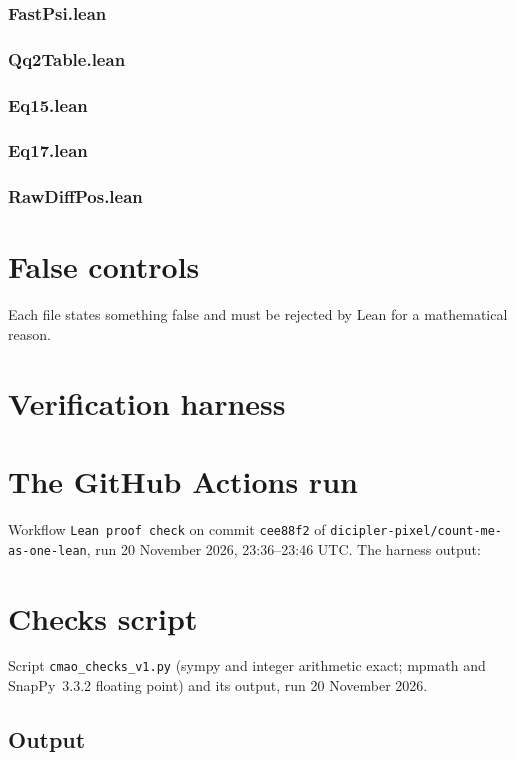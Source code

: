 \documentclass[11pt]{article}
\theoremstyle{definition}
\begin{document}
\subsubsection*{FastPsi.lean}
\subsubsection*{Qq2Table.lean}
\subsubsection*{Eq15.lean}
\subsubsection*{Eq17.lean}
\subsubsection*{RawDiffPos.lean}
\section{False controls}
Each file states something false and must be rejected by Lean for a mathematical reason.
\section{Verification harness}
\section{The GitHub Actions run}\label{app:ci}
Workflow \texttt{Lean proof check} on commit \texttt{cee88f2} of \texttt{dicipler-pixel/count-me-as-one-lean}, run 20 November 2026, 23:36--23:46 UTC. The harness output:
\section{Checks script}\label{app:checks}
Script \texttt{cmao\_checks\_v1.py} (sympy and integer arithmetic exact; mpmath and SnapPy~3.3.2 floating point) and its output, run 20 November 2026.
\subsection*{Output}
\end{document}
